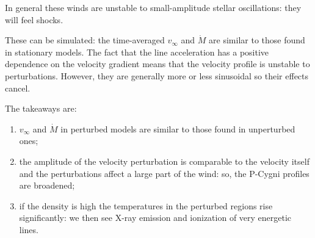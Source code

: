 \documentclass[main.tex]{subfiles}
\begin{document}
In general these winds are unstable to small-amplitude stellar oscillations: they will feel shocks.

These can be simulated: the time-averaged \(v_{ \infty }\) and \(\dot{M}\) are similar to those found in stationary models. 
The fact that the line acceleration has a positive dependence on the velocity gradient means that the velocity profile is unstable to perturbations. However, they are generally more or less sinusoidal so their effects cancel.

The takeaways are: 
\begin{enumerate}
  \item \(v_{ \infty }\) and \(\dot{M}\) in perturbed models are similar to those found in unperturbed ones;
  \item the amplitude of the velocity perturbation is comparable to the velocity itself and the perturbations affect a large part of the wind: so, the P-Cygni profiles are broadened;
  \item if the density is high the temperatures in the perturbed regions rise significantly: we then see X-ray emission and ionization of very energetic lines.
\end{enumerate}
\end{document}
